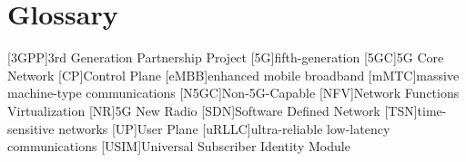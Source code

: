 \chapter{Glossary}

\footnotesize
\SingleSpacing

\begin{acronym}[AAAAAA]
	[3GPP]{3rd Generation Partnership Project}
	[5G]{fifth-generation}
	[5GC]{5G Core Network}
	[CP]{Control Plane}
	[eMBB]{enhanced mobile broadband}
	[mMTC]{massive machine-type communications}
	[N5GC]{Non-5G-Capable}
	[NFV]{Network Functions Virtualization}
	[NR]{5G New Radio}
	[SDN]{Software Defined Network}
	[TSN]{time-sensitive networks}
	[UP]{User Plane}
	[uRLLC]{ultra-reliable low-latency communications}
	[USIM]{Universal Subscriber Identity Module}
\end{acronym}
